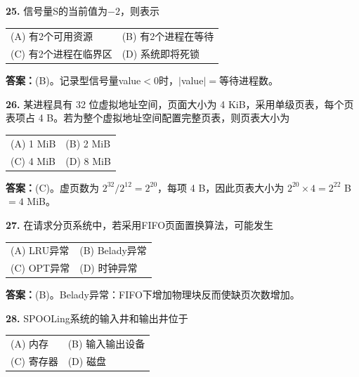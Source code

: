 \vspace{6pt}

\noindent\textbf{25.} 信号量S的当前值为$-2$，则表示
\begin{center}
\begin{tabular}{ll}
(A) 有2个可用资源 & (B) 有2个进程在等待 \\[6pt]
(C) 有2个进程在临界区 & (D) 系统即将死锁
\end{tabular}
\end{center}

\ifshowsolutions\par\noindent\textbf{答案：}(B)。记录型信号量value$<0$时，$|$value$|=$等待进程数。\else \answerarea \fi

\vspace{6pt}

\noindent\textbf{26.} 某进程具有 32 位虚拟地址空间，页面大小为 4 KiB，采用单级页表，每个页表项占 4 B。若为整个虚拟地址空间配置完整页表，则页表大小为
\begin{center}
\begin{tabular}{ll}
(A) 1 MiB & (B) 2 MiB \\[6pt]
(C) 4 MiB & (D) 8 MiB
\end{tabular}
\end{center}

\ifshowsolutions\par\noindent\textbf{答案：}(C)。虚页数为 $2^{32}/2^{12}=2^{20}$，每项 4 B，因此页表大小为 $2^{20}\times4=2^{22}$ B $=4$ MiB。\else \answerarea \fi

\vspace{6pt}

\noindent\textbf{27.} 在请求分页系统中，若采用FIFO页面置换算法，可能发生
\begin{center}
\begin{tabular}{ll}
(A) LRU异常 & (B) Belady异常 \\[6pt]
(C) OPT异常 & (D) 时钟异常
\end{tabular}
\end{center}

\ifshowsolutions\par\noindent\textbf{答案：}(B)。Belady异常：FIFO下增加物理块反而使缺页次数增加。\else \answerarea \fi

\vspace{6pt}

\noindent\textbf{28.} SPOOLing系统的输入井和输出井位于
\begin{center}
\begin{tabular}{ll}
(A) 内存 & (B) 输入输出设备 \\[6pt]
(C) 寄存器 & (D) 磁盘
\end{tabular}
\end{center}

